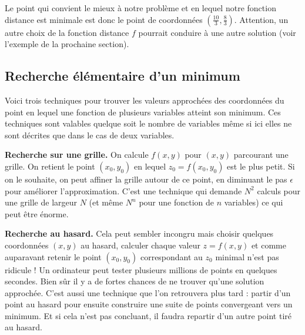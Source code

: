 \begin{exemple}{}{}
	
	Le point qui convient le mieux à notre problème et en lequel notre fonction distance est minimale est donc le point de coordonnées $(\frac{10}{3},\frac83)$. Attention, un autre choix de la fonction distance $f$ pourrait conduire à une autre solution (voir l'exemple de la prochaine section).
	
	
	
\end{exemple}

\subsection{Recherche élémentaire d'un minimum}


Voici trois techniques pour trouver les valeurs approchées des coordonnées du point en lequel une fonction de plusieurs variables atteint son minimum. Ces techniques sont valables quelque soit le nombre de variables même si ici elles ne sont décrites que dans le cas de deux variables. 

\textbf{Recherche sur une grille.} On calcule $f(x,y)$ pour $(x,y)$ parcourant une grille. On retient le point $(x_0,y_0)$ en lequel $z_0=f(x_0,y_0)$ est le plus petit. Si on le souhaite, on peut affiner la grille autour de ce point, en diminuant le pas $\epsilon$ pour améliorer l'approximation. C'est une technique qui demande $N^2$ calculs pour une grille de largeur $N$ (et même $N^n$ pour une fonction de $n$ variables) ce qui peut être énorme.



\textbf{Recherche au hasard.} Cela peut sembler incongru mais choisir quelques coordonnées $(x,y)$ au hasard, calculer chaque valeur $z=f(x,y)$ et comme auparavant retenir le point $(x_0,y_0)$ correspondant au $z_0$ minimal n'est pas ridicule !
Un ordinateur peut tester plusieurs millions de points en quelques secondes. Bien sûr il y a de fortes chances de ne trouver qu'une solution approchée. C'est aussi une technique que l'on retrouvera plus tard : partir d'un point au hasard pour ensuite construire une suite de points convergeant vers un minimum. Et si cela n'est pas concluant, il faudra repartir d'un autre point tiré au hasard.

\bigskip

